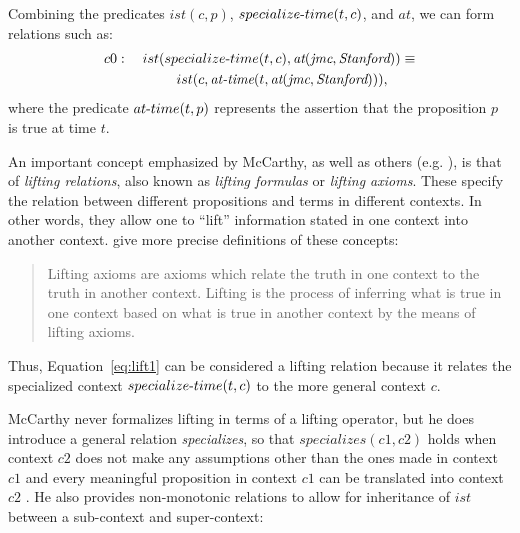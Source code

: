 Combining the predicates $ist(c, p)$, $specialize\textnormal{-}time(t, c)$, and $at$, we can form relations such as:
\begin{equation}
\label{eq:lift1}
\begin{aligned}
c0: \quad ist(specialize\textnormal{-}time(t,c),\hbox{\it at}
(\hbox{\it jmc},\hbox{\it Stanford}))
\equiv \\
ist(c,\hbox{\it at-time}(t,\hbox{\it at}(\hbox{\it jmc},
\hbox{\it Stanford}))),
\qquad
\end{aligned}
\end{equation}
where the predicate $at\textnormal{-}time(t,p)$ represents the assertion that the proposition $p$ is true at time $t$. 

An important concept emphasized by McCarthy, as well as others (e.g. \cite{guha1991contexts}), is that of \emph{lifting relations}, also known as \emph{lifting formulas} or \emph{lifting axioms}. These specify the relation between different propositions and terms in different contexts. In other words, they allow one to ``lift'' information stated in one context into another context. \cite{mccarthy1997formalizing} give more precise definitions of these concepts:
\begin{quote}
Lifting axioms are axioms which relate the truth in one context
to the truth in another context.
Lifting is the process of inferring what is true in one context based
on what is true in another context by the means of lifting axioms.
\end{quote}
Thus, Equation~\ref{eq:lift1} can be considered a lifting relation because it relates the specialized context $specialize\textnormal{-}time(t, c)$ to the more general context $c$. 

McCarthy never formalizes lifting in terms of a lifting operator, but he does introduce a general relation \emph{specializes}, so that $specializes(c1,c2)$ holds when context $c2$ does not make any assumptions other than the ones made in context $c1$ and every meaningful proposition in context $c1$ can be translated into context $c2$ \cite{McCarthy1993}. He also provides non-monotonic relations to allow for inheritance of $ist$ between a sub-context and super-context:

